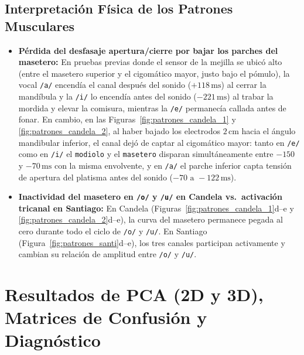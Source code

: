 \documentclass[11pt, a4paper]{article}
\begin{document}
\subsection{Interpretación Física de los Patrones Musculares}
\begin{itemize}\setlength{\itemsep}{2pt}
    \item \textbf{Pérdida del desfasaje apertura/cierre por bajar los parches del masetero:} En pruebas previas donde el sensor de la mejilla se ubicó alto (entre el masetero superior y el cigomático mayor, justo bajo el pómulo), la vocal \texttt{/a/} encendía el canal después del sonido ($+118\,\text{ms}$) al cerrar la mandíbula y la \texttt{/i/} lo encendía antes del sonido ($-221\,\text{ms}$) al trabar la mordida y elevar la comisura, mientras la \texttt{/e/} permanecía callada antes de fonar. En cambio, en las Figuras~\ref{fig:patrones_candela_1} y \ref{fig:patrones_candela_2}, al haber bajado los electrodos $2\,\text{cm}$ hacia el ángulo mandibular inferior, el canal dejó de captar al cigomático mayor: tanto en \texttt{/e/} como en \texttt{/i/} el \texttt{modiolo} y el \texttt{masetero} disparan simultáneamente entre $-150$ y $-70\,\text{ms}$ con la misma envolvente, y en \texttt{/a/} el parche inferior capta tensión de apertura del platisma antes del sonido ($-70\text{ a }-122\,\text{ms}$).
    \item \textbf{Inactividad del masetero en \texttt{/o/} y \texttt{/u/} en Candela vs.\ activación tricanal en Santiago:} En Candela (Figuras~\ref{fig:patrones_candela_1}d--e y \ref{fig:patrones_candela_2}d--e), la curva del masetero permanece pegada al cero durante todo el ciclo de \texttt{/o/} y \texttt{/u/}. En Santiago (Figura~\ref{fig:patrones_santi}d--e), los tres canales participan activamente y cambian su relación de amplitud entre \texttt{/o/} y \texttt{/u/}.
\end{itemize}

\section{Resultados de PCA (2D y 3D), Matrices de Confusión y Diagnóstico}
\end{document}
